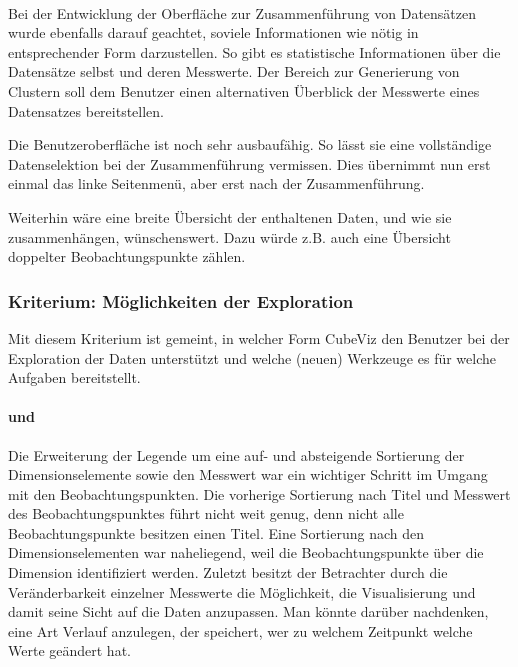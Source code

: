 \documentclass[11pt]{article}
\newcommand{\com}[1]{\marginpar{\em {\small{#1}}}} %
\begin{document}
\paragraph{} Bei der Entwicklung der Oberfläche zur Zusammenführung von Datensätzen wurde ebenfalls darauf geachtet, soviele Informationen wie nötig in entsprechender Form darzustellen. So gibt es statistische Informationen über die Datensätze selbst und deren Messwerte. Der Bereich zur Generierung von Clustern soll dem Benutzer einen alternativen Überblick der Messwerte eines Datensatzes bereitstellen. 

Die Benutzeroberfläche ist noch sehr ausbaufähig. So lässt sie eine vollständige Datenselektion bei der Zusammenführung vermissen. Dies übernimmt nun erst einmal das linke Seitenmenü, aber erst nach der Zusammenführung. 

\newpage
\noindent
Weiterhin wäre eine breite Übersicht der enthaltenen Daten, und wie sie zusammenhängen, wünschenswert. Dazu würde z.B. auch eine Übersicht doppelter Beobachtungspunkte zählen.


%
%
%
\subsubsection{Kriterium: Möglichkeiten der Exploration}

Mit diesem Kriterium ist gemeint, in welcher Form CubeViz den Benutzer bei der Exploration der Daten unterstützt und welche (neuen) Werkzeuge es für welche Aufgaben bereitstellt.


\paragraph{ und } Die Erweiterung der Legende um eine auf- und absteigende Sortierung der Dimensionselemente sowie den Messwert war ein wichtiger Schritt im Umgang mit den Beobachtungspunkten. Die vorherige Sortierung nach Titel und Messwert des Beobachtungspunktes führt nicht weit genug, denn nicht alle Beobachtungspunkte besitzen einen Titel. Eine Sortierung nach den Dimensionselementen war naheliegend, weil die Beobachtungspunkte über die Dimension identifiziert werden. Zuletzt besitzt der Betrachter durch die Veränderbarkeit einzelner Messwerte die Möglichkeit, die Visualisierung und damit seine Sicht auf die Daten anzupassen. Man könnte darüber nachdenken,\com{Anforderung \\ F-420, S. \pageref{req:F420}} eine Art Verlauf anzulegen, der speichert, wer zu welchem Zeitpunkt welche Werte geändert hat.
\end{document}
